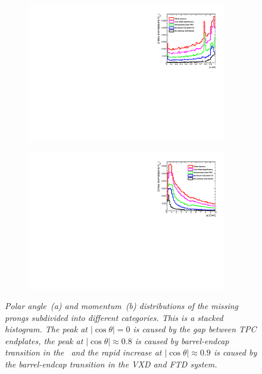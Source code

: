 \begin{figure}
\centering
\begin{subfigure}{0.5\textwidth}
    \includegraphics[width=0.95\textwidth]{ILD/plots/missed-tracks.pdf}
\caption{\label{fig:MissingTracks_cos_3} }
\end{subfigure}%
  \begin{subfigure}{0.5\textwidth}
\centering
    \includegraphics[width=0.95\textwidth]{ILD/plots/missed-momentum.pdf}
\caption{\label{fig:MissingTracks_p_3} }
\end{subfigure}
    \caption{\sl Polar angle~(a) and momentum~(b) distributions of the missing prongs subdivided into different categories. This is a stacked histogram. The peak at $|\cos\theta| = 0 $ is caused by the gap between TPC endplates, the peak at  $|\cos\theta| \approx 0.8$ is caused by barrel-endcap transition in the \ecal\ and the rapid increase at $|\cos\theta| \approx 0.9$ is caused by the barrel-endcap transition in the VXD and FTD system. }
    \label{fig:MissingTracks_3}
\end{figure}

